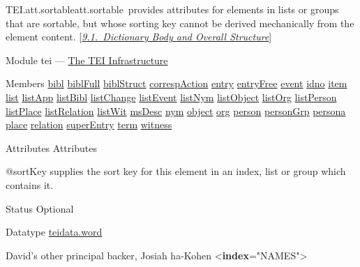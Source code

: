 \begin{reflist}
\item[]\begin{specHead}{TEI.att.sortable}{att.sortable} provides attributes for elements in lists or groups that are sortable, but whose sorting key cannot be derived mechanically from the element content. [\textit{\hyperref[DIBO]{9.1.\ Dictionary Body and Overall Structure}}]\end{specHead} 
    \item[{Module}]
  tei — \hyperref[ST]{The TEI Infrastructure}
    \item[{Members}]
  \hyperref[TEI.bibl]{bibl} \hyperref[TEI.biblFull]{biblFull} \hyperref[TEI.biblStruct]{biblStruct} \hyperref[TEI.correspAction]{correspAction} \hyperref[TEI.entry]{entry} \hyperref[TEI.entryFree]{entryFree} \hyperref[TEI.event]{event} \hyperref[TEI.idno]{idno} \hyperref[TEI.item]{item} \hyperref[TEI.list]{list} \hyperref[TEI.listApp]{listApp} \hyperref[TEI.listBibl]{listBibl} \hyperref[TEI.listChange]{listChange} \hyperref[TEI.listEvent]{listEvent} \hyperref[TEI.listNym]{listNym} \hyperref[TEI.listObject]{listObject} \hyperref[TEI.listOrg]{listOrg} \hyperref[TEI.listPerson]{listPerson} \hyperref[TEI.listPlace]{listPlace} \hyperref[TEI.listRelation]{listRelation} \hyperref[TEI.listWit]{listWit} \hyperref[TEI.msDesc]{msDesc} \hyperref[TEI.nym]{nym} \hyperref[TEI.object]{object} \hyperref[TEI.org]{org} \hyperref[TEI.person]{person} \hyperref[TEI.personGrp]{personGrp} \hyperref[TEI.persona]{persona} \hyperref[TEI.place]{place} \hyperref[TEI.relation]{relation} \hyperref[TEI.superEntry]{superEntry} \hyperref[TEI.term]{term} \hyperref[TEI.witness]{witness}
    \item[{Attributes}]
  Attributes\hfil\\[-10pt]\begin{sansreflist}
    \item[@sortKey]
  supplies the sort key for this element in an index, list or group which contains it.
\begin{reflist}
    \item[{Status}]
  Optional
    \item[{Datatype}]
  \hyperref[TEI.teidata.word]{teidata.word}
    \item[]\exampleFont David's other principal backer, Josiah\mbox{}\newline 
 ha-Kohen {<\textbf{index}\hspace*{1em}{indexName}="{NAMES}">}\mbox{}\newline 

\end{reflist}
\end{sansreflist}
\end{reflist}
